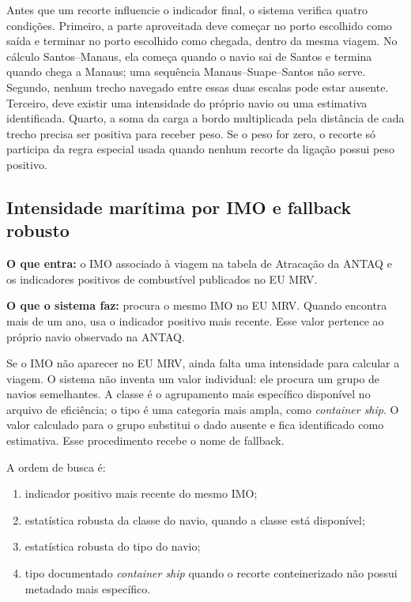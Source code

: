 \documentclass[12pt,a4paper]{article}
\begin{document}
Antes que um recorte influencie o indicador final, o sistema verifica quatro condições. Primeiro, a parte aproveitada deve começar no porto escolhido como saída e terminar no porto escolhido como chegada, dentro da mesma viagem. No cálculo Santos--Manaus, ela começa quando o navio sai de Santos e termina quando chega a Manaus; uma sequência Manaus--Suape--Santos não serve. Segundo, nenhum trecho navegado entre essas duas escalas pode estar ausente. Terceiro, deve existir uma intensidade do próprio navio ou uma estimativa identificada. Quarto, a soma da carga a bordo multiplicada pela distância de cada trecho precisa ser positiva para receber peso. Se o peso for zero, o recorte só participa da regra especial usada quando nenhum recorte da ligação possui peso positivo.

\subsection{Intensidade marítima por IMO e fallback robusto}
\label{subsec:intensidade-mrv}

\textbf{O que entra:} o IMO associado à viagem na tabela de Atracação da ANTAQ e os indicadores positivos de combustível publicados no EU MRV.

\textbf{O que o sistema faz:} procura o mesmo IMO no EU MRV. Quando encontra mais de um ano, usa o indicador positivo mais recente. Esse valor pertence ao próprio navio observado na ANTAQ.

Se o IMO não aparecer no EU MRV, ainda falta uma intensidade para calcular a viagem. O sistema não inventa um valor individual: ele procura um grupo de navios semelhantes. A classe é o agrupamento mais específico disponível no arquivo de eficiência; o tipo é uma categoria mais ampla, como \textit{container ship}. O valor calculado para o grupo substitui o dado ausente e fica identificado como estimativa. Esse procedimento recebe o nome de fallback.

A ordem de busca é:

\begin{enumerate}
  \item indicador positivo mais recente do mesmo IMO;
  \item estatística robusta da classe do navio, quando a classe está disponível;
  \item estatística robusta do tipo do navio;
  \item tipo documentado \textit{container ship} quando o recorte conteinerizado não possui metadado mais específico.
\end{enumerate}
\end{document}
